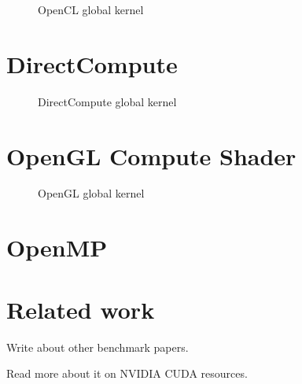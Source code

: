 \begin{figure}
	\centering
	\begin{framed}
			
	\end{framed}
	\caption{OpenCL global kernel}
	\label{lst:sample:global:ocl}	
\end{figure}

\section{DirectCompute}

\begin{figure}
	\centering
	\begin{framed}
			
	\end{framed}
	\caption{DirectCompute global kernel}
	\label{lst:sample:global:dx}	
\end{figure}

\section{OpenGL Compute Shader}

\begin{figure}
	\centering
	\begin{framed}
			
	\end{framed}
	\caption{OpenGL global kernel}
	\label{lst:sample:global:gl}	
\end{figure}

\section{OpenMP}

\section{Related work}

Write about other benchmark papers.

Read more about it on NVIDIA CUDA resources.